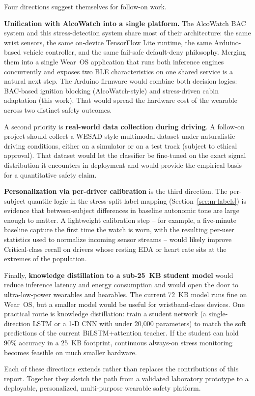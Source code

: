 Four directions suggest themselves for follow-on work.

\textbf{Unification with AlcoWatch into a single platform.}
The AlcoWatch BAC system \citep{acn1408} and this stress-detection
system share most of their architecture: the same wrist sensors,
the same on-device TensorFlow Lite runtime, the same Arduino-based
vehicle controller, and the same fail-safe default-deny philosophy.
Merging them into a single Wear~OS application that runs both
inference engines concurrently and exposes two BLE characteristics
on one shared service is a natural next step. The Arduino firmware
would combine both decision logics: BAC-based ignition blocking
(AlcoWatch-style) and stress-driven cabin adaptation (this work).
That would spread the hardware cost of the wearable across two
distinct safety outcomes.

A second priority is \textbf{real-world data collection during
driving}. A follow-on project should collect a WESAD-style multimodal
dataset under naturalistic driving conditions, either on a simulator
or on a test track (subject to ethical approval). That dataset would
let the classifier be fine-tuned on the exact signal distribution it
encounters in deployment and would provide the empirical basis for a
quantitative safety claim.

\textbf{Personalization via per-driver calibration} is the third
direction. The per-subject quantile logic in the stress-split label
mapping (Section~\ref{sec:m-labels}) is evidence that between-subject
differences in baseline autonomic tone are large enough to matter.
A lightweight calibration step -- for example, a five-minute baseline
capture the first time the watch is worn, with the resulting per-user
statistics used to normalize incoming sensor streams -- would likely
improve Critical-class recall on drivers whose resting EDA or heart
rate sits at the extremes of the population.

Finally, \textbf{knowledge distillation to a sub-25~KB student model}
would reduce inference latency and energy consumption and would open
the door to ultra-low-power wearables and hearables. The current
72~KB model runs fine on Wear~OS, but a smaller model would be useful
for wristband-class devices. One practical route is knowledge
distillation: train a student network (a single-direction LSTM or a
1-D CNN with under 20{,}000 parameters) to match the soft predictions
of the current BiLSTM+attention teacher. If the student can hold 90\%
accuracy in a 25~KB footprint, continuous always-on stress monitoring
becomes feasible on much smaller hardware.

Each of these directions extends rather than replaces the contributions
of this report. Together they sketch the path from a validated
laboratory prototype to a deployable, personalized, multi-purpose
wearable safety platform.

